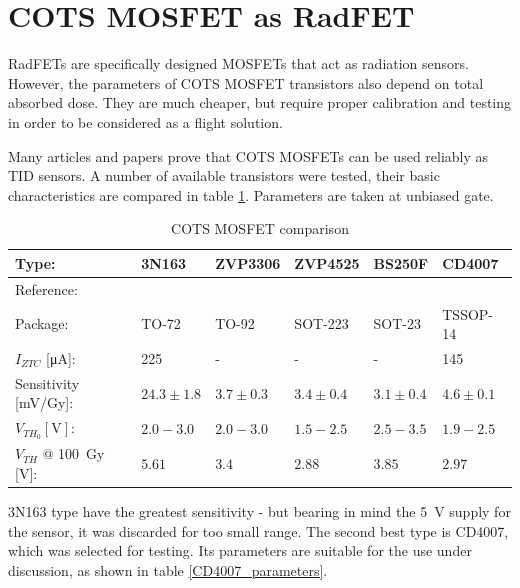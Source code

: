 \section{COTS MOSFET as RadFET}
    RadFETs are specifically designed MOSFETs that act as radiation sensors. However, the parameters of COTS MOSFET transistors also depend on total absorbed dose. They are much cheaper, but require proper calibration and testing in order to be considered as a flight solution.

    Many articles and papers prove that COTS MOSFETs can be used reliably as TID sensors. A number of available transistors were tested, their basic characteristics are compared in table \ref{cots_mosfet_comparison}. Parameters are taken at unbiased gate.

    \begin{table}[H]
    \begin{tabular}{| L{2cm} | C{2.4cm} | C{2.4cm} | C{2.4cm} | C{2.4cm} | C{2.4cm} |}
        \hline
        Type: & 3N163 & ZVP3306 & ZVP4525 & BS250F & CD4007 \\ \hline
        Reference: & \cite{3N163_article} & \cite{COTSMosfetsGarcia} & \cite{COTSMosfetsGarcia} & \cite{COTSMosfetsGarcia} & \cite{COTSMosfetsGarcia} \\ \hline

        Package: & TO-72 & TO-92 & SOT-223 & SOT-23 & TSSOP-14 \\ \hline

        $I_{ZTC}$ [\si{\micro\ampere}]: & 225 & - & - & - & 145 \\ \hline

        Sensitivity [\si{\milli\volt/\gray}]: & $24.3\pm 1.8$ & $3.7\pm 0.3$ & $3.4\pm 0.4$ & $3.1\pm 0.4$ & $4.6\pm 0.1$ \\ \hline

        $V_{TH_0} [\si{\volt}]$: & $2.0 - 3.0$ & $2.0 - 3.0$ & $1.5 - 2.5$ & $2.5 - 3.5$ & $1.9 - 2.5$ \\ \hline

        $V_{TH}$ @ \SI{100}{\gray} [\si{\volt}]: & $5.61$ & $3.4$ & $2.88$ & $3.85$ & $2.97$ \\ \hline
    \end{tabular}
    \caption{COTS MOSFET comparison}
    \label{cots_mosfet_comparison}
    \end{table}

    3N163 type have the greatest sensitivity - but bearing in mind the \SI{5}{\volt} supply for the sensor, it was discarded for too small range. The second best type is CD4007, which was selected for testing. Its parameters are suitable for the use under discussion, as shown in table \ref{CD4007_parameters}.

